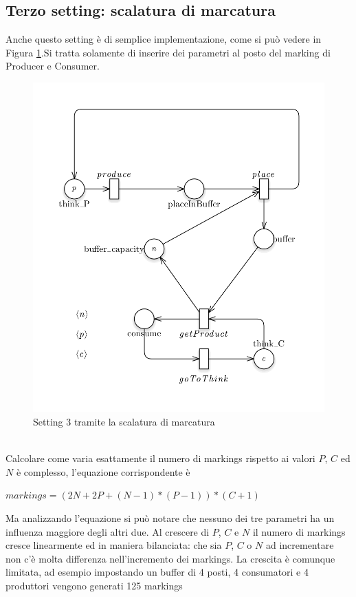\documentclass{article}
\begin{document}
\subsection{Terzo  setting: scalatura di marcatura}\label{SEC:terzo-marking}
Anche questo setting è di semplice implementazione, come si può vedere in Figura \ref{FIG:setting3_markdown}.Si tratta solamente di inserire dei parametri al posto del marking di Producer e Consumer.
\begin{figure}[!h]
\centering
\includegraphics[width=\textwidth]{./Esercizio2_img/setting3_markdown.png}
\caption{Setting 3 tramite la scalatura di marcatura} \label{FIG:setting3_markdown}
\end{figure}\\
Calcolare come varia esattamente il numero di markings rispetto ai valori $P$, $C$ ed $N$ è complesso, l'equazione corrispondente è\begin{center}$markings = (2N + 2P + (N-1) * (P-1)) * (C+1)$\end{center}
Ma analizzando l'equazione si può notare che nessuno dei tre parametri ha un influenza maggiore degli altri due.
Al crescere di $P$, $C$ e $N$ il numero di markings cresce linearmente ed in maniera bilanciata: che sia $P$, $C$ o $N$ ad incrementare non c'è molta differenza nell'incremento dei markings.
La crescita è comunque limitata, ad esempio impostando un buffer di 4 posti, 4 consumatori e 4 produttori vengono generati 125 markings
\newpage
\end{document}
